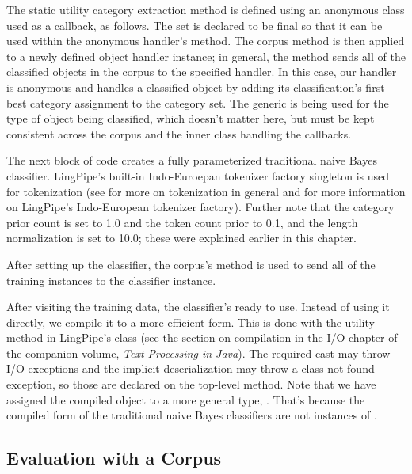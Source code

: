 The static utility category extraction method is defined using an
anonymous class used as a callback, as follows.
%
%
The set is declared to be final so that it can be used within the
anonymous handler's method.  The corpus method  is
then applied to a newly defined object handler instance; in general,
the  method sends all of the classified objects in
the corpus to the specified handler.  In this case, our handler is
anonymous and handles a classified object by adding its
classification's first best category assignment to the category set.
The generic  is being used for the type of object being
classified, which doesn't matter here, but must be kept consistent
across the corpus and the inner class handling the callbacks.

The next block of code creates a fully parameterized traditional
naive Bayes classifier.
%
%
LingPipe's built-in Indo-Euroepan tokenizer factory singleton is used
for tokenization (see  for more on tokenization
in general and  for more information on
LingPipe's Indo-European tokenizer factory).  Further note that the
category prior count is set to 1.0 and the token count prior to 0.1,
and the length normalization is set to 10.0; these were explained
earlier in this chapter.

After setting up the classifier, the corpus's 
method is used to send all of the training instances to the
classifier instance.  

After visiting the training data, the classifier's ready to use.
Instead of using it directly, we compile it to a more efficient form.
This is done with the utility method  in LingPipe's
 class (see the section on compilation in
the I/O chapter of the companion volume, {\it Text Processing in Java}).
The
required cast may throw I/O exceptions and the implicit
deserialization may throw a class-not-found exception, so those are
declared on the top-level  method.  Note that we have
assigned the compiled object to a more general type,
.  That's because the compiled form of the
traditional naive Bayes classifiers are not instances of
.

\subsection{Evaluation with a Corpus}\label{section:naive-bayes-corpus-eval}


